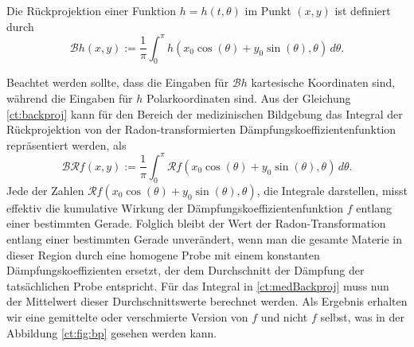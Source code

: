 \begin{definition}
	Die Rückprojektion einer Funktion $h = h(t, \theta)$ im Punkt $(x, y)$ ist definiert durch
	\begin{equation}\label{ct:backproj}
		\mathscr{B}h(x, y) := \dfrac{1}{\pi}\int_{0}^{\pi} h(x_0\cos(\theta) + y_0\sin(\theta), \theta) \,d\theta.
	\end{equation}
\end{definition}
Beachtet werden sollte, dass die Eingaben für $\mathscr{B}h$ kartesische Koordinaten sind, während die Eingaben für $h$ Polarkoordinaten sind.
Aus der Gleichung \eqref{ct:backproj} kann für den Bereich der medizinischen Bildgebung das Integral der Rückprojektion von der Radon-transformierten Dämpfungskoeffizientenfunktion repräsentiert werden, als
\begin{equation}\label{ct:medBackproj}
	\mathscr{B}\mathscr{R}f(x, y) := \dfrac{1}{\pi}\int_{0}^{\pi} \mathscr{R}f(x_0\cos(\theta) + y_0\sin(\theta), \theta) \,d\theta.
\end{equation}
Jede der Zahlen $\mathscr{R}f(x_0\cos(\theta) + y_0\sin(\theta), \theta)$, die Integrale darstellen, misst effektiv die kumulative Wirkung der Dämpfungskoeffizientenfunktion $f$ entlang einer bestimmten Gerade. Folglich bleibt der Wert der Radon-Transformation entlang einer bestimmten Gerade unverändert, wenn man die gesamte Materie in dieser Region durch eine homogene Probe mit einem konstanten Dämpfungskoeffizienten ersetzt, der dem Durchschnitt der Dämpfung der tatsächlichen Probe entspricht. Für das Integral in \eqref{ct:medBackproj} muss nun der Mittelwert dieser Durchschnittswerte berechnet werden. Als Ergebnis erhalten wir eine \glqq gemittelte\grqq{} oder \glqq verschmierte\grqq{} Version von $f$ und nicht $f$ selbst, was in der Abbildung \ref{ct:fig:bp} gesehen werden kann.

